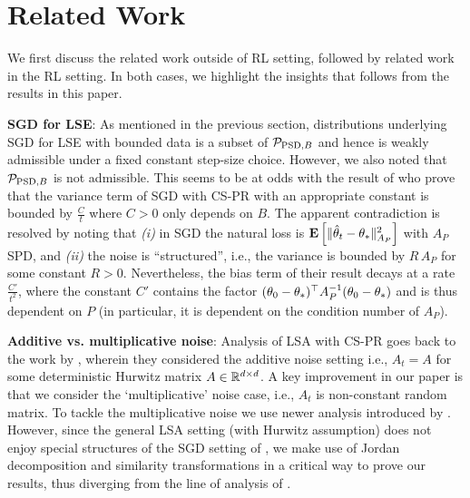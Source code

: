 \section{Related Work}\label{sec:related}
We first discuss the related work outside of RL setting, followed by related work in the RL setting. In both cases, we highlight the  insights that follows from the results in this paper.

\textbf{SGD for LSE}: As mentioned in the previous section, distributions underlying
SGD for LSE with bounded data 
is a subset of $\P_{\text{PSD},B}$ and hence is weakly admissible under a fixed constant step-size choice. 
However, we also noted that $\P_{\text{PSD},B}$ is not admissible. This seems to be at odds with the result of \citet{bach}
who prove that the variance term of SGD with CS-PR with an appropriate constant is bounded by
$\frac{C}{t}$ where $C>0$ only depends on $B$. The apparent contradiction is resolved by noting that 
{\em (i)} in SGD the natural loss is $\EE{\normsm{\thh_t-\ts}^2_{A_P}}$ with $A_P$ SPD, and 
{\em (ii)} the noise is ``structured'', i.e., the variance  
is bounded by $R\,A_P$ for some constant $R>0$. 
Nevertheless, the bias term of their result
decays at a rate $\frac{C'}{t^2}$, where the constant $C'$ contains the factor $(\theta_0-\ts)^\top A^{-1}_P (\theta_0-\ts)$ and is thus dependent on $P$ (in particular, it is dependent on the condition number of $A_P$).

\textbf{Additive vs. multiplicative noise}: Analysis of LSA with CS-PR goes back to the work by \citet{polyak-judisky}, wherein they considered the additive noise setting i.e., $A_t=A$ for some deterministic Hurwitz matrix $A\in \R^{\dcd}$.
A key improvement in our paper is that we consider the `multiplicative' noise case, i.e., $A_t$ is non-constant random matrix. To tackle the multiplicative noise we use newer analysis introduced by \citet{bach}. However, since the general LSA setting (with Hurwitz assumption) does not enjoy special structures of the SGD setting of \citet{bach}, we make use of Jordan decomposition and similarity transformations in a critical way to prove our results, thus diverging from the line of analysis of 
\citet{bach}.

